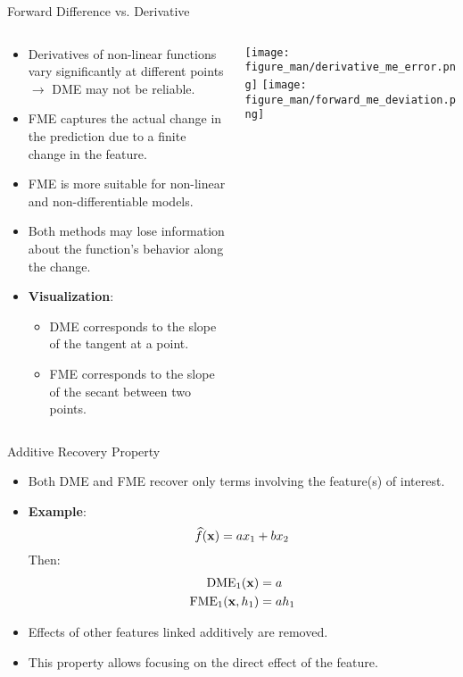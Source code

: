 \documentclass[10pt,compress,t,notes=noshow, xcolor=table]{beamer}
\begin{document}
\begin{frame}{Forward Difference vs. Derivative}
\begin{columns}[T]
\begin{column}{0.65\textwidth}
\begin{itemize}
\item Derivatives of non-linear functions vary significantly at different points $\rightarrow$ DME may not be reliable.
\item FME captures the actual change in the prediction due to a finite change in the feature.
\item FME is more suitable for non-linear and non-differentiable models.
\item Both methods may lose information about the function's behavior along the change.
\item \textbf{Visualization}:
\begin{itemize}
\item DME corresponds to the slope of the tangent at a point.
\item FME corresponds to the slope of the secant between two points.
\end{itemize}
\end{itemize}
\end{column}
\begin{column}{0.35\textwidth}
\texttt{[image: figure\_man/derivative\_me\_error.png]}
\texttt{[image: figure\_man/forward\_me\_deviation.png]}
\end{column}
\end{columns}
\end{frame}

\begin{frame}{Additive Recovery Property}
\begin{itemize}
\item Both DME and FME recover only terms involving the feature(s) of interest.
\item \textbf{Example}:
\[
\widehat{f}(\mathbf{x}) = a x_1 + b x_2
\]
Then:
\begin{align*}
\text{DME}_1(\mathbf{x}) &= a \\
\text{FME}_1(\mathbf{x}, h_1) &= a h_1
\end{align*}
\item Effects of other features linked additively are removed.
\item This property allows focusing on the direct effect of the feature.
\end{itemize}
\end{frame}
\end{document}
